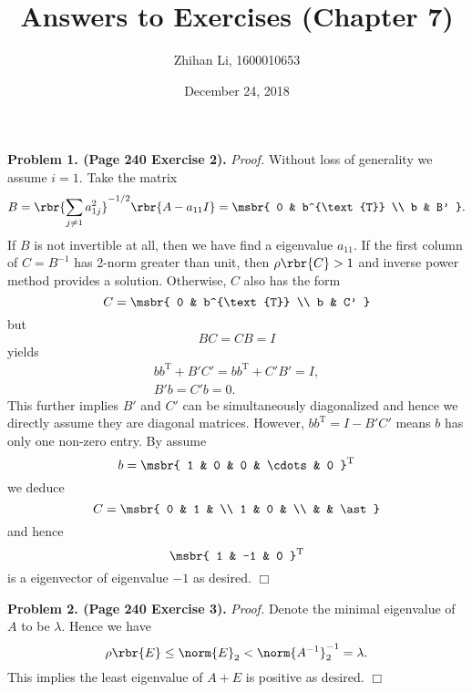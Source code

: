 \documentclass[english, nochinese]{pnote}
\title{Answers to Exercises (Chapter 7)}
\author{Zhihan Li, 1600010653}
\date{December 24, 2018}
\begin{document}
\maketitle

\textbf{Problem 1. (Page 240 Exercise 2).} \textit{Proof.} Without loss of generality we assume $ i = 1 $. Take the matrix
\begin{equation}
B = \rbr{\sum_{ j \neq 1 } a_{ 1 j }^2 }^{ -1 / 2 } \rbr{ A - a_{ 1 1 } I } = \msbr{ 0 & b^{\text{T}} \\ b & B' }.
\end{equation}
If $B$ is not invertible at all, then we have find a eigenvalue $ a_{ 1 1 } $. If the first column of $ C = B^{-1} $ has 2-norm greater than unit, then $ \rho \rbr{C} > 1 $ and inverse power method provides a solution. Otherwise, $C$ also has the form
\begin{equation}
C = \msbr{ 0 & b^{\text{T}} \\ b & C' }
\end{equation}
but
\begin{equation}
B C = C B = I
\end{equation}
yields
\begin{gather}
b b^{\text{T}} + B' C' = b b^{\text{T}} + C' B' = I, \\
B' b = C' b = 0.
\end{gather}
This further implies $B'$ and $C'$ can be simultaneously diagonalized and hence we directly assume they are diagonal matrices. However, $ b b^{\text{T}} = I - B' C' $ means $b$ has only one non-zero entry. By assume
\begin{equation}
b = \msbr{ 1 & 0 & 0 & \cdots & 0 }^{\text{T}}
\end{equation}
we deduce
\begin{equation}
C = \msbr{ 0 & 1 & \\ 1 & 0 & \\ & & \ast }
\end{equation}
and hence
\begin{equation}
\msbr{ 1 & -1 & 0 }^{\text{T}}
\end{equation}
is a eigenvector of eigenvalue $-1$ as desired.
\hfill$\Box$

\textbf{Problem 2. (Page 240 Exercise 3).} \textit{Proof.} Denote the minimal eigenvalue of $A$ to be $\lambda$. Hence we have
\begin{equation}
\rho \rbr{E} \le \norm{E}_2 < \norm{A^{-1}}_2^{-1} = \lambda.
\end{equation}
This implies the least eigenvalue of $ A + E $ is positive as desired.
\hfill$\Box$
\end{document}

